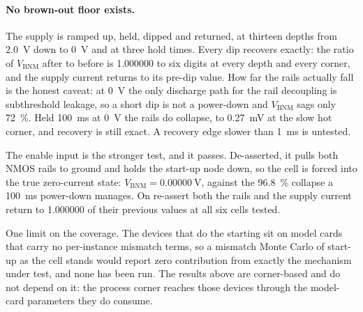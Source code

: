\paragraph{No brown-out floor exists.} The supply is ramped up, held, dipped and
returned, at thirteen depths from \SI{2.0}{\volt} down to \SI{0}{\volt} and at
three hold times. Every dip recovers exactly: the ratio of \(V_{\mathrm{BNM}}\)
after to before is \num{1.000000} to six digits at every depth and every corner,
and the supply current returns to its pre-dip value. How far the rails actually
fall is the honest caveat: at \SI{0}{\volt} the only discharge path for the
rail decoupling is subthreshold leakage, so a short dip is not a power-down and
\(V_{\mathrm{BNM}}\) sags only \SI{72}{\percent}. Held \SI{100}{\milli\second}
at \SI{0}{\volt} the rails do collapse, to \SI{0.27}{\milli\volt} at the slow
hot corner, and recovery is still exact. A recovery edge slower than
\SI{1}{\milli\second} is untested.

The enable input is the stronger test, and it passes. De-asserted, it pulls both
NMOS rails to ground and holds the start-up node down, so the cell is forced
into the true zero-current state: \(V_{\mathrm{BNM}} =
\SI{0.00000}{\volt}\), against the \SI{96.8}{\percent} collapse a
\SI{100}{\milli\second} power-down manages. On re-assert both the rails and the
supply current return to \num{1.000000} of their previous values at all six
cells tested.

One limit on the coverage. The devices that do the starting sit on model cards
that carry no per-instance mismatch terms, so a mismatch Monte Carlo of start-up
as the cell stands would report zero contribution from exactly the mechanism
under test, and none has been run. The results above are corner-based and do not
depend on it: the process corner reaches those devices through the model-card
parameters they do consume.
